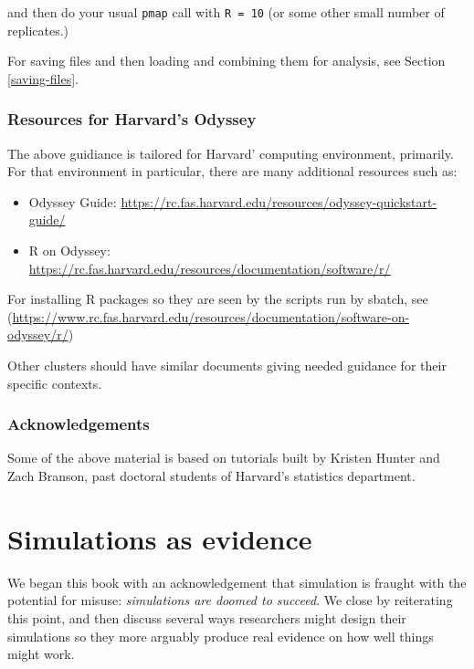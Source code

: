 \documentclass[
]{book}
\providecommand{\tightlist}{%
  \setlength{\itemsep}{0pt}\setlength{\parskip}{0pt}}
\begin{document}
and then do your usual \texttt{pmap} call with \texttt{R\ =\ 10} (or some other small number of replicates.)

For saving files and then loading and combining them for analysis, see Section \ref{saving-files}.

\subsection{Resources for Harvard's Odyssey}\label{resources-for-harvards-odyssey}

The above guidiance is tailored for Harvard' computing environment, primarily.
For that environment in particular, there are many additional resources such as:

\begin{itemize}
\tightlist
\item
  Odyssey Guide: \url{https://rc.fas.harvard.edu/resources/odyssey-quickstart-guide/}
\item
  R on Odyssey: \url{https://rc.fas.harvard.edu/resources/documentation/software/r/}
\end{itemize}

For installing R packages so they are seen by the scripts run by sbatch, see (\url{https://www.rc.fas.harvard.edu/resources/documentation/software-on-odyssey/r/})

Other clusters should have similar documents giving needed guidance for their specific contexts.

\subsection{Acknowledgements}\label{acknowledgements-1}

Some of the above material is based on tutorials built by Kristen Hunter and Zach Branson, past doctoral students of Harvard's statistics department.

\chapter{Simulations as evidence}\label{simulations-as-evidence}

We began this book with an acknowledgement that simulation is fraught with the potential for misuse: \emph{simulations are doomed to succeed}.
We close by reiterating this point, and then discuss several ways researchers might design their simulations so they more arguably produce real evidence on how well things might work.
\end{document}
